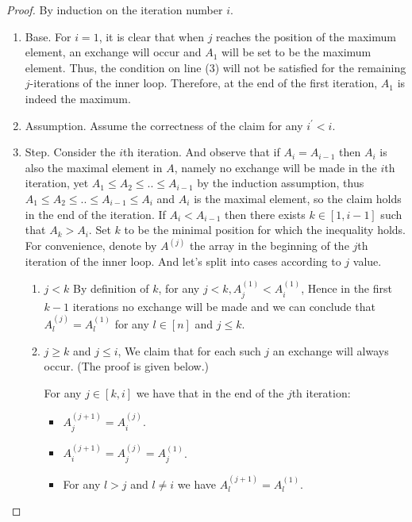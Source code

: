 \documentclass[manuscript,screen,review]{acmart}
\begin{document}
\begin{proof}
  By induction on the iteration number $i$. 
  \begin{enumerate}
    \item Base. For $i=1$, it is clear that when $j$ reaches the position of the maximum element, an exchange will occur and $A_{1}$ will be set to be the maximum element. Thus, the condition on line (3) will not be satisfied for the remaining $j$-iterations of the inner loop. Therefore, at the end of the first iteration, $A_{1}$ is indeed the maximum.
    \item Assumption. Assume the correctness of the claim for any $i^{\prime} < i$. 
    \item Step. Consider the $i$th iteration. And observe that if $A_{i} = A_{i-1}$ then $A_{i}$ is also the maximal element in $A$, namely no exchange will be made in the $i$th iteration, yet $A_{1} \le A_{2} \le .. \le A_{i-1}$ by the induction assumption, thus  $A_{1} \le A_{2} \le .. \le A_{i-1} \le A_{i}$ and $A_{i}$ is the maximal element, so the claim holds in the end of the iteration. 
      If $A_{i} < A_{i-1}$ then there exists $k \in [1,i-1]$ such that $A_{k} > A_{i}$. Set $k$ to be the minimal position for which the inequality holds. For convenience, denote by $A^{(j)}$ the array in the beginning of the $j$th iteration of the inner loop. And let's split into cases according to $j$ value. 
      \begin{enumerate}
        \item $j < k$ By definition of $k$, for any $j < k, A^{(1)}_{j} < A^{(1)}_{i}$, Hence in the first $k-1$ iterations no exchange will be made and we can conclude that $A^{(j)}_{l} = A^{(1)}_{l}$ for any $l \in [n]$ and $j \le k$. 
        \item $j \ge k$ and $j\le i$, We claim that for each such $j$ an exchange will always occur. (The proof is given below.)
          \begin{claim}
            \label{claim:second}
            For any $j \in [k,i]$ we have that in the end of the $j$th iteration:  
            \begin{itemize}
              \item $A^{(j+1)}_{j} = A^{(j)}_{i}$.
              \item $A^{(j+1)}_{i} = A^{(j)}_{j} = A^{(1)}_{j}$.
              \item For any $l > j$ and $l \neq i$ we have $A^{(j+1)}_{l} = A^{(1)}_{l}$.
            \end{itemize}
          \end{claim}


\end{enumerate}
\end{enumerate}
\end{proof}
\end{document}
